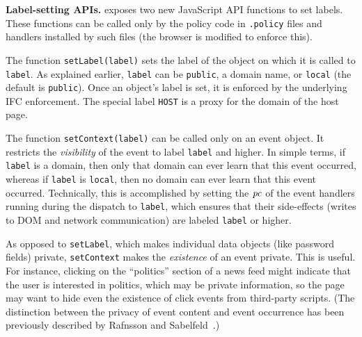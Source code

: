 \medskip \noindent \textbf{Label-setting APIs.}
{\sys} exposes two new JavaScript API functions to set labels. These
functions can be called only by the policy code in \texttt{.policy}
files and handlers installed by such files (the browser is modified to
enforce this).

The function \texttt{setLabel(label)} sets the label of the object on
which it is called to \texttt{label}. As explained
earlier, \texttt{label} can be \texttt{public}, a domain name,
or \texttt{local} (the default is \texttt{public}). Once an object's
label is set, it is enforced by the underlying IFC enforcement. The
special label \texttt{HOST} is a proxy for the domain of the host
page.

The function \texttt{setContext(label)} can be called only on an event
object. It restricts the \emph{visibility} of the event to
label \texttt{label} and higher. In simple terms, if \texttt{label} is
a domain, then only that domain can ever learn that this event
occurred, whereas if \texttt{label} is \texttt{local}, then no domain
can ever learn that this event occurred. Technically, this is
accomplished by setting the $\mathit{pc}$ of the 
event handlers running during the dispatch to \texttt{label}, which
ensures that their side-effects (writes to DOM and network
communication) are labeled \texttt{label} or higher.

As opposed to \texttt{setLabel}, which makes individual data objects
(like password fields) private, \texttt{setContext} makes the
\emph{existence} of an event private. This is useful.
For instance, clicking on the ``politics'' section of a news feed
might indicate that the user is interested in politics, which may be
private information, so the page may want to hide even the existence
of click events from third-party scripts. (The distinction between the
privacy of event content and event occurrence has been previously
described by Rafnsson and Sabelfeld~\cite{Rafnsson-csf13}.)

